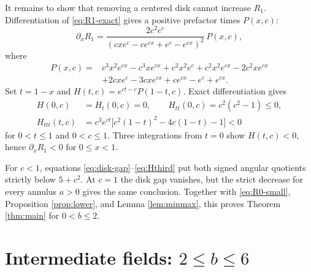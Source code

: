 \documentclass[11pt]{article}
\begin{document}
It remains to show that removing a centered disk cannot increase $R_1$.
Differentiation of \eqref{eq:R1-exact} gives a positive prefactor times
$P(x,c)$:
\begin{equation}\label{eq:derivative-P}
 \partial_xR_1=
 \frac{2c^2e^c}{(cxe^c-ce^{cx}+e^c-e^{cx})^2}\,P(x,c),
\end{equation}
where
\begin{align*}
P(x,c)={}&c^3x^2e^{cx}-c^3xe^{cx}+c^2x^2e^c+c^2x^2e^{cx}
 -2c^2xe^{cx}\\
&+2cxe^c-3cxe^{cx}+ce^{cx}-e^c+e^{cx}.
\end{align*}
Set $t=1-x$ and $H(t,c)=e^{ct-c}P(1-t,c)$.  Exact differentiation gives
\begin{align}
 H(0,c)&=H_t(0,c)=0,\qquad
 H_{tt}(0,c)=c^2(c^2-1)\leq0,                                  \label{eq:Hdata}\\
 H_{ttt}(t,c)&=c^3e^{ct}
 \bigl[c^2(1-t)^2-4c(1-t)-1\bigr]<0                            \label{eq:Hthird}
\end{align}
for $0<t\leq1$ and $0<c\leq1$.  Three integrations from $t=0$ show
$H(t,c)<0$, hence $\partial_xR_1<0$ for $0\leq x<1$.

For $c<1$, equations \eqref{eq:disk-gap}--\eqref{eq:Hthird} put both signed
angular quotients strictly below $5+c^2$.  At $c=1$ the disk gap vanishes,
but the strict decrease for every annulus $a>0$ gives the same conclusion.
Together with \eqref{eq:R0-small}, Proposition \ref{prop:lower}, and Lemma
\ref{lem:minmax}, this proves Theorem \ref{thm:main} for $0<b\leq2$.

\section[Intermediate fields: 2 <= b <= 6]{Intermediate fields: $2\leq b\leq6$}\label{sec:intermediate}
\end{document}
